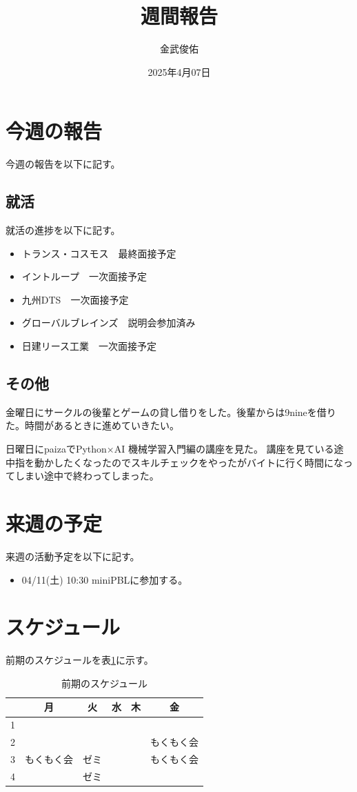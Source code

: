 \documentclass[a4paper,12pt]{ujarticle}
\title{週間報告}
\author{金武俊佑}
\date{2025年4月07日}
\newcommand{\thc}[1]{\multicolumn{1}{c|}{#1}}
\begin{document}
\maketitle

\section{今週の報告}\label{sec:thisweek}
今週の報告を以下に記す。
\subsection{就活}\label{sec:job}
就活の進捗を以下に記す。
\begin{itemize}
  \item トランス・コスモス　最終面接予定
  \item イントループ　一次面接予定
  \item 九州DTS　一次面接予定
  \item グローバルブレインズ　説明会参加済み
  \item 日建リース工業　一次面接予定
\end{itemize}
\subsection{その他}\label{sec:other}
金曜日にサークルの後輩とゲームの貸し借りをした。後輩からは9nineを借りた。時間があるときに進めていきたい。


日曜日にpaizaでPython×AI 機械学習入門編の講座を見た。
講座を見ている途中指を動かしたくなったのでスキルチェックをやったがバイトに行く時間になってしまい途中で終わってしまった。
\section{来週の予定}\label{sec:nextweek}
来週の活動予定を以下に記す。
\begin{itemize}
  \item 04/11(土) 10:30 miniPBLに参加する。
\end{itemize}


\section{スケジュール}\label{sec:schedule}
前期のスケジュールを表\ref{tab:studyschedule}に示す。

\begin{table}[H]
  \caption{前期のスケジュール}\label{tab:studyschedule}
  \centering
  \begin{tabular}{|p{4mm}||p{30mm}|p{30mm}|p{30mm}|p{30mm}|p{30mm}|}\hline
        & \thc{月} & \thc{火} & \thc{水} & \thc{木} & \thc{金} \\ \hline\hline
     1  &     &     &     &  &   \\ \hline
     2  &     &  &  &  & もくもく会\\ \hline
     3  & もくもく会  & ゼミ &  & &もくもく会  \\ \hline
     4  &  & ゼミ & &  & \\ \hline
  \end{tabular}
\end{table}
\end{document}
